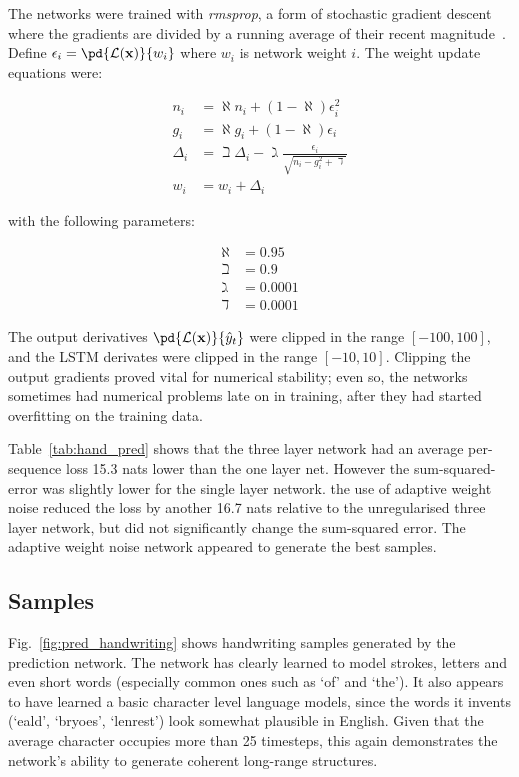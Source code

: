 The networks were trained with \emph{rmsprop}, a form of stochastic gradient descent where the gradients are divided by a running average of their recent magnitude~\cite{tieleman12rms}. Define $\epsilon_i = \pd{\mathcal{L}(\mathbf{x})}{w_i}$ where $w_i$ is network weight $i$. The weight update equations were:

\begin{align}
n_i &= \aleph n_i + (1-\aleph) \epsilon_i^2\\
g_i &= \aleph g_i + (1-\aleph) \epsilon_i\\
\Delta_i &= \beth \Delta_i - \gimel \frac{\epsilon_i}{\sqrt{n_i - g_i^2 + \daleth}}\\
w_i &= w_i + \Delta_i
\end{align}

with the following parameters:

\begin{align}
\aleph &= 0.95\\
\beth &= 0.9\\	
\gimel &= 0.0001\\	
\daleth &= 0.0001
\end{align}

The output derivatives $\pd{\mathcal{L}(\mathbf{x})}{\hat{y}_t}$ were clipped in the range $[-100,100]$, and the LSTM derivates were clipped in the range $[-10,10]$. Clipping the output gradients proved vital for numerical stability; even so, the networks sometimes had numerical problems late on in training, after they had started overfitting on the training data.

Table~\ref{tab:hand_pred} shows that the three layer network had an average per-sequence loss 15.3 nats lower than the one layer net. However the sum-squared-error was slightly lower for the single layer network. the use of adaptive weight noise reduced the loss by another 16.7 nats relative to the unregularised three layer network, but did not significantly change the sum-squared error. The adaptive weight noise network appeared to generate the best samples.

\subsection{Samples}

Fig.~\ref{fig:pred_handwriting} shows handwriting samples generated by the prediction network. The network has clearly learned to model strokes, letters and even short words (especially common ones such as `of' and `the'). It also appears to have learned a basic character level language models, since the words it invents (`eald', `bryoes', `lenrest') look somewhat plausible in English. Given that the average character occupies more than 25 timesteps, this again demonstrates the network's ability to generate coherent long-range structures.

